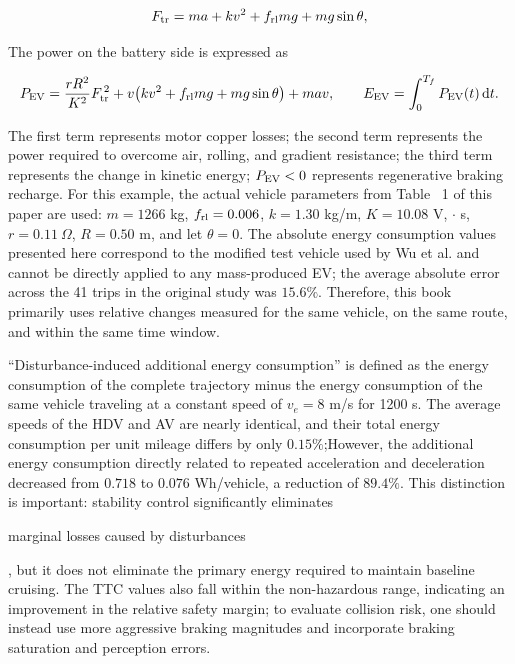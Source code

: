 \documentclass[11pt,a4paper,openany]{book}
\numberwithin{equation}{chapter}
\numberwithin{figure}{chapter}
\numberwithin{table}{chapter}
\newcommand{\cnemph}[1]{{\quotefont #1}}
\begin{document}
\begin{equation}
F_{\rm tr}=ma+kv^2+f_{\rm rl}mg+mg\sin\theta,
\label{eq:wu-tractive-force}
\end{equation}

The power on the battery side is expressed as

\begin{equation}
P_{\rm EV}
=\frac{rR^2}{K^2}F_{\rm tr}^{\,2}
+v\!\left(kv^2+f_{\rm rl}mg+mg\sin\theta\right)+mav,
\qquad
E_{\rm EV}=\int_0^{T_f}P_{\rm EV}(t)\,{\rm d}t.
\label{eq:wu-ev-power}
\end{equation}

The first term represents motor copper losses; the second term represents the power required to overcome air, rolling, and gradient resistance; the third term represents the change in kinetic energy; $P_{\rm EV}<0$ represents regenerative braking recharge. For this example, the actual vehicle parameters from Table ~1 of this paper are used: $m=1266$ kg, $f_{\rm rl}=0.006$, $k=1.30$ kg/m, $K=10.08$ V, $\cdot$ s, $r=0.11\ \Omega$, $R=0.50$ m, and let $\theta=0$. The absolute energy consumption values presented here correspond to the modified test vehicle used by Wu et al. and cannot be directly applied to any mass-produced EV; the average absolute error across the 41 trips in the original study was $15.6\%$. Therefore, this book primarily uses relative changes measured for the same vehicle, on the same route, and within the same time window.




“Disturbance-induced additional energy consumption” is defined as the energy consumption of the complete trajectory minus the energy consumption of the same vehicle traveling at a constant speed of $v_e=8$ m/s for 1200 s. The average speeds of the HDV and AV are nearly identical, and their total energy consumption per unit mileage differs by only $0.15\%$;However, the additional energy consumption directly related to repeated acceleration and deceleration decreased from $0.718$ to $0.076$ Wh/vehicle, a reduction of $89.4\%$. This distinction is important: stability control significantly eliminates




\cnemph{marginal losses caused by disturbances}




, but it does not eliminate the primary energy required to maintain baseline cruising. The TTC values also fall within the non-hazardous range, indicating an improvement in the relative safety margin; to evaluate collision risk, one should instead use more aggressive braking magnitudes and incorporate braking saturation and perception errors.
\end{document}
